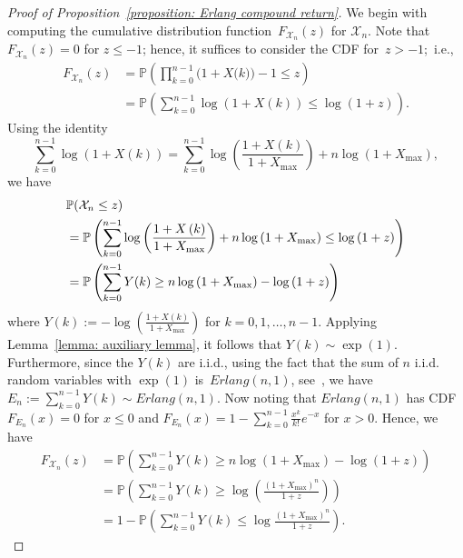 \begin{proof}[Proof of Proposition~\ref{proposition: Erlang compound return}] We begin with computing the cumulative distribution function~$F_{\mathcal{X}_n}(z)$ for $\mathcal{X}_n$. Note that~$F_{\mathcal{X}_n}(z)= 0$ for $z \le -1$; hence, it suffices to consider the CDF for~$z > -1$;~i.e.,
\begin{align*}
	F_{\mathcal{X}_n}(z)
	&= \mathbb{P}\left( {\prod\limits_{k = 0}^{n - 1} {(1 + X(} k)) - 1 \le z} \right)
	\\
	&= \mathbb{P}\left( {\sum\limits_{k = 0}^{n - 1} {\log (1 + X(k))}  \le \log \left( {1 + z} \right)} \right).
\end{align*}
Using the identity 
{\small 
\[
\sum_{k = 0}^{n - 1} {\log (1 + X(k))}  = \sum_{k = 0}^{n - 1} {\log \left( {\frac{{1 + X( k )}}{1 + X_{\max }}} \right)}  + n\log \left( {1 + {X_{\max }}} \right),
\]
}we have
{\small \begin{align*}
 &\mathbb{P} ({\cal X}_n \le z) \\
	&= \mathbb{P} \left( {\sum_{k = 0}^{n - 1} {\log \left( {\frac{{1 + X\left( k \right)}}{{1+X_{\max} }}} \right)}  + n\log \left( {1+X_{\max} } \right) \le \log \left( {1 + z} \right)} \right)
	\\
	&  = \mathbb{P} \left( {\sum_{k = 0}^{n - 1} Y (k) \ge n\log \left( 1 + X_{\max} \right) - \log \left( {1 + z} \right)} \right)
\end{align*}
}where
$ Y(k) := - \log \left( \frac{1 + X( k )}{1+X_{\max}} \right)
$
for $k=0,1, \dots ,n-1$.
Applying Lemma~\ref{lemma: auxiliary lemma}, it follows that $Y(k)\sim \exp(1)$. Furthermore, since the $Y(k)$ are i.i.d., using the fact that the sum of $n$ i.i.d. random variables with $\exp(1)$ is~$Erlang(n,1)$, see~\cite{gubner2006probability}, we have
$
E_n := \sum_{k=0}^{n-1} Y(k) \sim Erlang(n,1).
$
Now noting that $Erlang(n,1)$ has CDF $F_{E_n}(x) =0$ for $x \le 0$ and
$
F_{E_n}(x)= 1 - \sum_{k=0}^{n-1} \frac{x^k}{k!}e^{-x}
$  
for $x>0$. Hence, we have
\begin{align*}
	F_{\mathcal{X}_n}(z)
	& = \mathbb{P}\left( { \sum_{k=0}^{n-1} Y(k)   \ge n\log \left( {1 + {X_{\max }}} \right) - \log \left( {1 + z} \right)} \right)
	\\
	& = \mathbb{P}\left( {\sum_{k=0}^{n-1} Y(k)  \ge \log \left( {\frac{{{ {\left( 1 + X_{\max } \right) }^n}}}{{1 + z}}} \right)} \right)
	\\ 
	&= 1 - \mathbb{P}\left( {\sum_{k=0}^{n-1} Y(k)   \le \log  {\frac{{{{\left( 1+X_{\max} \right)}^n}}}{{1 + z}}} } \right).
\end{align*}

\end{proof}
